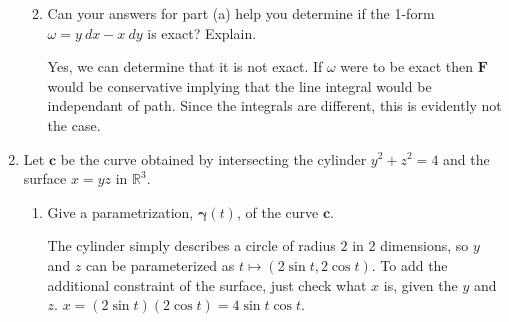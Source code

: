 \documentclass{article}
\newcommand{\gam}{\boldsymbol{\gamma}}
\begin{document}
\begin{enumerate}
\begin{enumerate}
\begin{enumerate}[label=(\roman*)]
                \end{enumerate}
            \item Can your answers for part (a) help you determine if the 1-form $\omega = y\ dx - x \ dy$ is exact? Explain.

                Yes, we can determine that it is not exact. If $\omega$ were to be exact then $\boldsymbol{F}$ would be conservative implying that the line integral would be independant of path. Since the integrals are different, this is evidently not the case.

        \end{enumerate}
    \newpage
    \item Let $\boldsymbol{c}$ be the curve obtained by intersecting the cylinder $y^2 + z^2 = 4$ and the surface $x=yz$ in $\mathbb{R}^3$.
        \begin{enumerate}
            \item Give a parametrization, $\gam (t)$, of the curve $\boldsymbol{c}$.

                The cylinder simply describes a circle of radius $2$ in 2 dimensions, so $y$ and $z$ can be parameterized as $t \mapsto (2 \sin t, 2 \cos t)$. To add the additional constraint of the surface, just check what $x$ is, given the $y$ and $z$. $x = (2\sin t)(2\cos t) = 4\sin t \cos t$.
               

\end{enumerate}
\end{enumerate}
\end{document}
